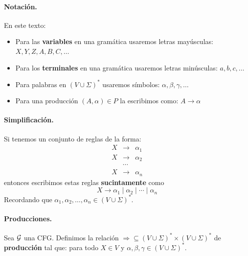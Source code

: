 \paragraph{Notación.} En este texto:
\begin{itemize}
    \item Para las \textbf{variables} en una gramática usaremos letras mayúsculas: $X,Y,Z,A,B,C,\ldots$
    \item Para los \textbf{terminales} en una gramática usaremos letras minúsculas: $a,b,c,\ldots$
    \item Para palabras en $(V \cup \Sigma)^*$ usaremos símbolos: $\alpha, \beta, \gamma, \ldots$
    \item Para una producción $(A,\alpha) \in P$ la escribimos como: $A \to \alpha$
\end{itemize}

\paragraph{Simplificación.} Si tenemos un conjunto de reglas de la forma:
$$
    \begin{array}{lll}
        X & \rightarrow & \alpha_1 \\
        X & \rightarrow & \alpha_2 \\
          & \cdots      &          \\
        X & \rightarrow & \alpha_n
    \end{array}
$$
entonces escribimos estas reglas \textbf{sucintamente} como
$$
    X \to \alpha_1 \mid \alpha_2 \mid \cdots \mid \alpha_n
$$
Recordando que $\alpha_1, \alpha_2, \ldots, \alpha_n \in (V \cup \Sigma)^*$.


\paragraph{Producciones.} Sea $\mathcal{G}$ una CFG. Definimos la relación $\Rightarrow \subseteq(V \cup \Sigma)^* \times(V \cup \Sigma)^*$ de \textbf{producción} tal que:
para todo $X \in V$ y $\alpha, \beta, \gamma \in(V \cup \Sigma)^*$. \medbreak

